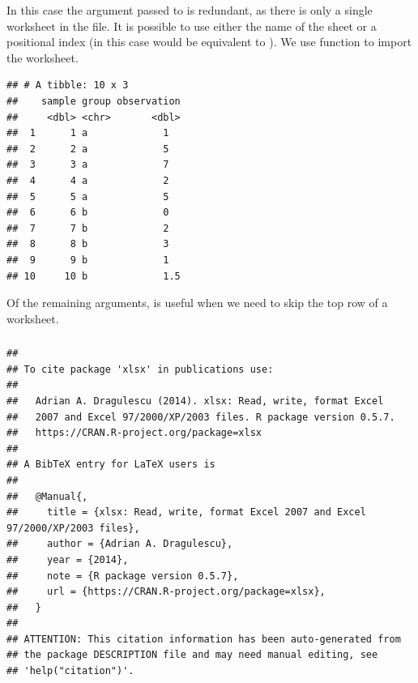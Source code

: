 \documentclass[krantz2]{krantz}\usepackage{knitr}%
\begin{document}
In this case the argument passed to  is redundant, as there is only a single worksheet in the file. It is possible to use either the name of the sheet or a positional index (in this case  would be equivalent to ). We use function  to import the worksheet.
\begin{knitrout}\footnotesize
{}\color{fgcolor}\begin{kframe}
\begin{alltt}
 \hlkwb{<-} \hlstd{(}\hlstd{,}  \hlstd{=} \hlstd{)}
\end{alltt}
\begin{verbatim}
## # A tibble: 10 x 3
##    sample group observation
##     <dbl> <chr>       <dbl>
##  1      1 a             1  
##  2      2 a             5  
##  3      3 a             7  
##  4      4 a             2  
##  5      5 a             5  
##  6      6 b             0  
##  7      7 b             2  
##  8      8 b             3  
##  9      9 b             1  
## 10     10 b             1.5
\end{verbatim}
\end{kframe}
\end{knitrout}

Of the remaining arguments,  is useful when we need to skip the top row of a worksheet.

\subsubsection['xlsx']{}

\begin{knitrout}\footnotesize
{}\color{fgcolor}\begin{kframe}
\begin{alltt}
\hlstd{(} \hlstd{=} \hlstd{)}
\end{alltt}
\begin{verbatim}
## 
## To cite package 'xlsx' in publications use:
## 
##   Adrian A. Dragulescu (2014). xlsx: Read, write, format Excel
##   2007 and Excel 97/2000/XP/2003 files. R package version 0.5.7.
##   https://CRAN.R-project.org/package=xlsx
## 
## A BibTeX entry for LaTeX users is
## 
##   @Manual{,
##     title = {xlsx: Read, write, format Excel 2007 and Excel 97/2000/XP/2003 files},
##     author = {Adrian A. Dragulescu},
##     year = {2014},
##     note = {R package version 0.5.7},
##     url = {https://CRAN.R-project.org/package=xlsx},
##   }
## 
## ATTENTION: This citation information has been auto-generated from
## the package DESCRIPTION file and may need manual editing, see
## 'help("citation")'.
\end{verbatim}
\end{kframe}
\end{knitrout}
\end{document}
